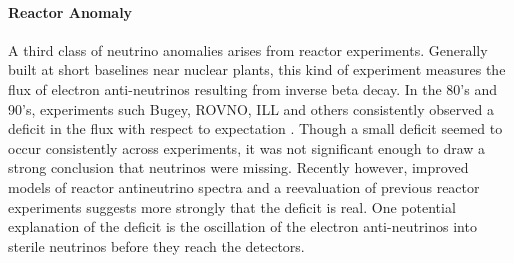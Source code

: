 \documentclass[12pt]{article}
\begin{document}

\paragraph{Reactor Anomaly}
A third class of neutrino anomalies arises from reactor experiments. Generally built at short baselines near nuclear plants, this kind of experiment measures the flux of electron anti-neutrinos resulting from inverse beta decay. In the 80's and 90's, experiments such Bugey, ROVNO, ILL and others consistently observed a deficit in the flux with respect to expectation \cite{bib:bugey} \cite{bib:rovno}. Though a small deficit seemed to occur consistently across experiments, it was not significant enough to draw a strong conclusion that neutrinos were missing.  Recently however, improved models of reactor antineutrino spectra \cite{bib:reactorImproved} and a reevaluation of previous reactor experiments \cite{bib:reactorGeneral} suggests more strongly that the deficit is real.  One potential explanation of the deficit is the oscillation of the electron anti-neutrinos into sterile neutrinos before they reach the detectors.  
\end{document}
